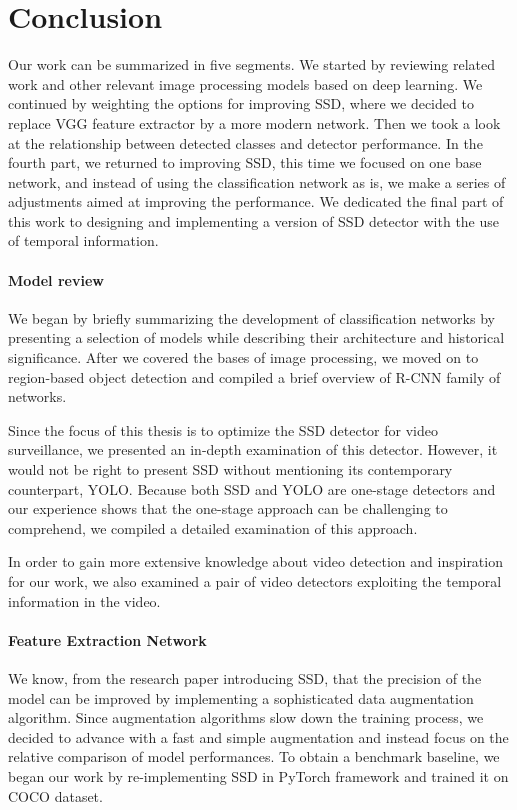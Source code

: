 \chapter*{Conclusion}

Our work can be summarized in five segments. We started by reviewing related work and other relevant image processing models based on deep learning. We continued by weighting the options for improving SSD, where we decided to replace VGG feature extractor by a more modern network. Then we took a look at the relationship between detected classes and detector performance. In the fourth part, we returned to improving SSD, this time we focused on one base network, and instead of using the classification network as is, we make a series of adjustments aimed at improving the performance. We dedicated the final part of this work to designing and implementing a version of SSD detector with the use of temporal information.

\subsubsection*{Model review}
We began by briefly summarizing the development of classification networks by presenting a selection of models while describing their architecture and historical significance. After we covered the bases of image processing, we moved on to region-based object detection and compiled a brief overview of R-CNN family of networks.

Since the focus of this thesis is to optimize the SSD detector for video surveillance, we presented an in-depth examination of this detector. However, it would not be right to present SSD without mentioning its contemporary counterpart, YOLO. Because both SSD and YOLO are one-stage detectors and our experience shows that the one-stage approach can be challenging to comprehend, we compiled a detailed examination of this approach.

In order to gain more extensive knowledge about video detection and inspiration for our work, we also examined a pair of video detectors exploiting the temporal information in the video.

\subsubsection*{Feature Extraction Network}
We know, from the research paper introducing SSD, that the precision of the model can be improved by implementing a sophisticated data augmentation algorithm. Since augmentation algorithms slow down the training process, we decided to advance with a fast and simple augmentation and instead focus on the relative comparison of model performances. To obtain a benchmark baseline, we began our work by re-implementing SSD in PyTorch framework and trained it on COCO dataset.

